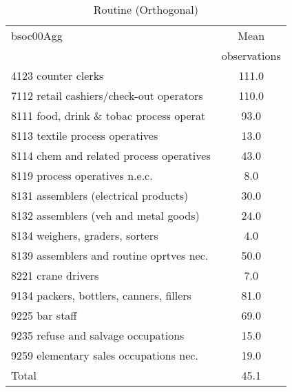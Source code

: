 \begin{table}
	\centering
	\caption{Routine (Orthogonal)}
	\begin{tabular}{lc}
	\toprule	
		
bsoc00Agg&Mean \\
&observations \\
\hline
4123 counter clerks&111.0 \\
7112 retail cashiers/check-out operators&110.0 \\
8111 food, drink \& tobac process operat&93.0 \\
8113 textile process operatives&13.0 \\
8114 chem and related process operatives&43.0 \\
8119 process operatives n.e.c.&8.0 \\
8131 assemblers (electrical products)&30.0 \\
8132 assemblers (veh and metal goods)&24.0 \\
8134 weighers, graders, sorters&4.0 \\
8139 assemblers and routine oprtves nec.&50.0 \\
8221 crane drivers&7.0 \\
9134 packers, bottlers, canners, fillers&81.0 \\
9225 bar staff&69.0 \\
9235 refuse and salvage occupations&15.0 \\
9259 elementary sales occupations nec.&19.0 \\
Total&45.1 \\
\bottomrule
\bottomrule
\end{tabular}
\end{table}
